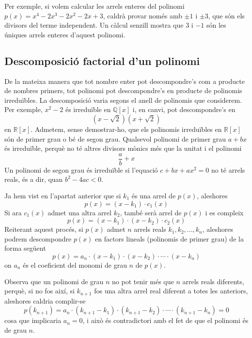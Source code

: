 Per exemple, si volem calcular les arrels enteres del polinomi $p(x)=x^{4}-2x^{3}-2x^{2}-2x+3$, caldrà provar només amb $\pm 1$ i $\pm
3$, que són els divisors del terme independent. Un càlcul senzill mostra que $3$ i $-1$ són les úniques arrels enteres d'aquest
polinomi.

\subsection{Descomposició factorial d'un polinomi}

De la mateixa manera que tot nombre enter pot descompondre's com a producte
de nombres primers, tot polinomi pot descompondre's en producte de
polinomis irreduïbles. La descomposició varia segons el
anell de polinomis que considerem. Per exemple, $x^{2}-2$ és irreduïble
en $\mathbb{Q}[x]$ i, en canvi, pot descompondre's en
\begin{equation*}
(x-\sqrt{2})(x+\sqrt{2})
\end{equation*}
en $\mathbb{R}[x]$. Admetem, sense demostrar-ho, que els polinomis
irreduïbles en $\mathbb{R}[x]$ són de primer grau o bé de segon grau.
Qualsevol polinomi de primer grau $a+bx$ és irreduïble, perquè no té
altres divisors mònics més que la unitat i el polinomi\begin{equation*}
\frac{a}{b}+x
\end{equation*}Un polinomi de segon grau és irreduïble si l'equació $c+bx+ax^{2}=0$ no té arrels reals, és a dir, quan $b^{2}-4ac<0$.

Ja hem vist en l'apartat anterior que si $k_{1}$ és una arrel de $p(x)$, aleshores\begin{equation*}
p(x)=(x-k_{1})\cdot c_{1}(x)
\end{equation*}Si ara $c_{1}(x)$ admet una altra arrel $k_{2}$, també serà arrel de $p(x)$ i es compleix\begin{equation*}
p(x)=(x-k_{1})\cdot (x-k_{2})\cdot c_{2}(x)
\end{equation*}Reiterant aquest procés, si $p(x)$ admet $n$ arrels reals $k_{1},k_{2},...,k_{n}$, aleshores podrem descompondre $p(x)$ en factors
lineals (polinomis de primer grau) de la forma següent\begin{equation}
p(x)=a_{n}\cdot (x-k_{1})\cdot (x-k_{2})\cdot \cdots \cdot (x-k_{n})
\label{4}
\end{equation}on $a_{n}$ és el coeficient del monomi de grau $n$ de $p(x)$.

Observa que un polinomi de grau $n$ no pot tenir més que $n$ arrels reals diferents, perquè, si no fos així, si $k_{n+1}$ fos una altra arrel real diferent a totes les anteriors, aleshores caldria complir-se\begin{equation*}
p(k_{n+1})=a_{n}\cdot (k_{n+1}-k_{1})\cdot (k_{n+1}-k_{2})\cdot \cdots \cdot
(k_{n+1}-k_{n})=0
\end{equation*}cosa que implicaria $a_{n}=0$, i això és contradictori amb el fet de
que el polinomi és de grau $n$.

